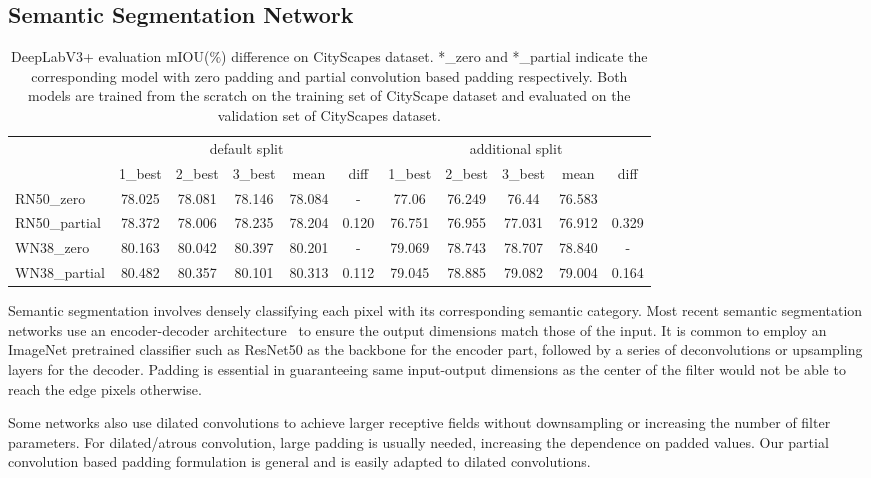 \documentclass[10pt,twocolumn,letterpaper]{article}
\begin{document}
\subsection{Semantic Segmentation Network}\begin{table*}[h]
    \centering
    \begin{tabular}{l|c|c|c|c|c||c|c|c|c|c}
    \multicolumn{1}{c|}{} & \multicolumn{5}{c||}{default split} & \multicolumn{5}{c}{additional split} \\
     & 1\_best & 2\_best & 3\_best & mean & diff & 1\_best & 2\_best & 3\_best & mean & diff \\
    \hline
    RN50\_zero & 78.025 & 78.081 & 78.146 & 78.084 & - & 77.06 & 76.249 & 76.44 & 76.583 \\
    RN50\_partial & 78.372 & 78.006 & 78.235 & 78.204 & 0.120 & 76.751 & 76.955 & 77.031 & 76.912 & 0.329 \\
    \hline
    \hline
    WN38\_zero & 80.163 & 80.042 & 80.397 & 80.201 & - & 79.069 & 78.743 & 78.707 & 78.840 & - \\
    WN38\_partial & 80.482 & 80.357 & 80.101 & 80.313 & 0.112 & 79.045 & 78.885 & 79.082 & 79.004 & 0.164
    \end{tabular}
    \caption{DeepLabV3+ evaluation mIOU($\%$) difference on CityScapes dataset. *\_zero and *\_partial indicate  the corresponding model with zero padding and partial convolution based padding respectively. Both models are trained from the scratch on the training set of CityScape dataset and evaluated on the validation set of CityScapes dataset.}
    \label{tab:seg}
\end{table*}Semantic segmentation involves densely classifying each pixel with its corresponding semantic category. Most recent semantic segmentation networks use an encoder-decoder architecture~\cite{ronneberger2015u,badrinarayanan2015segnet} to ensure the output dimensions match those of the input. It is common to employ an ImageNet pretrained classifier such as ResNet50 as the backbone for the encoder part, followed by a series of deconvolutions or upsampling layers for the decoder. Padding is essential in guaranteeing same input-output dimensions as the center of the filter would not be able to reach the edge pixels otherwise.

Some networks also use dilated convolutions to achieve larger receptive fields without downsampling or increasing the number of filter parameters. For dilated/atrous convolution, large padding is usually needed, increasing the dependence on padded values. Our partial convolution based padding formulation is general and is easily adapted to dilated convolutions.
\end{document}
